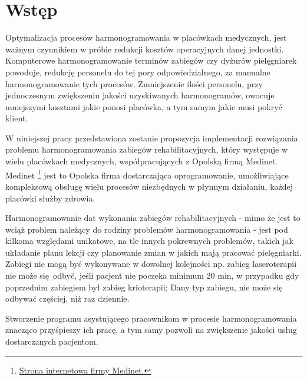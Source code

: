  \section*{Wstęp}
 Optymalizacja procesów harmonogramowania w placówkach medycznych, jest
	ważnym czynnikiem w próbie redukcji kosztów operacyjnych danej
	jednostki. Komputerowe harmonogramowanie terminów zabiegów czy dyżurów
	pielęgniarek powoduje, redukcję personelu do tej pory odpowiedzialnego,
	za manualne harmonogramowanie tych procesów. Zmniejszenie ilości
	personelu, przy jednoczesnym zwiększeniu jakości uzyskiwanych
	harmonogramów, owocuje mniejszymi kosztami jakie ponosi placówka, a tym
	samym jakie musi pokryć klient.

W niniejszej pracy przedstawiona zostanie propozycja implementacji rozwiązania
problemu harmonogramowania zabiegów rehabilitacyjnych, który występuje w wielu
placówkach medycznych, współpracujących z Opolską firmą Medinet. Medinet
\footnote{\href{http://www.medinet.opole.pl/}{Strona internetowa firmy Medinet.}} jest to
Opolska firma dostarczająca oprogramowanie, umożliwiające kompleksową obsługę
wielu procesów niezbędnych w płynnym działaniu, każdej placówki służby zdrowia.

Harmonogramowanie dat wykonania zabiegów rehabilitacyjnych - mimo że jest to wciąż
problem należący do rodziny problemów harmonogramowania - jest pod kilkoma
względami unikatowe, na tle innych pokrewnych problemów, takich jak
układanie planu lekcji czy planowanie zmian w jakich mają pracować pielęgniarki.
Zabiegi nie mogą być wykonywane
w dowolnej kolejności np. zabieg laseroterapii nie może się odbyć, jeśli pacjent
nie poczeka minimum 20 min, w przypadku gdy poprzednim zabiegiem był zabieg
krioterapii; Dany typ zabiegu, nie może się odbywać częściej, niż raz dziennie.

Stworzenie programu asystującego pracownikom w procesie harmonogramowania
znacząco przyśpieszy ich pracę, a tym samy pozwoli na zwiększenie jakości usług
dostarczanych pacjentom.
